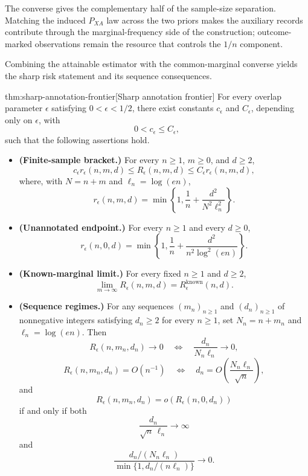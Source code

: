 \documentclass[11pt]{article}
\begin{document}
The converse gives the complementary half of the sample-size separation. Matching the induced \(P_{XA}\) law across the two priors makes the auxiliary records contribute through the marginal-frequency side of the construction; outcome-marked observations remain the resource that controls the \(1/n\) component.

Combining the attainable estimator with the common-marginal converse yields the sharp risk statement and its sequence consequences.

\begin{theoremv}{thm:sharp-annotation-frontier}[Sharp annotation frontier]
For every overlap parameter \(\epsilon\) satisfying \(0<\epsilon<1/2\), there exist constants \(c_\epsilon\) and \(C_\epsilon\), depending only on \(\epsilon\), with
\[
0<c_\epsilon\le C_\epsilon,
\]
such that the following assertions hold.

\begin{itemize}
\item \textbf{(Finite-sample bracket.)} For every \(n\ge1\), \(m\ge0\), and \(d\ge2\),
\[
c_\epsilon r_\epsilon(n,m,d)
\le R_\epsilon(n,m,d)
\le C_\epsilon r_\epsilon(n,m,d),
\]
where, with \(N=n+m\) and \(\ell_n=\log(en)\),
\[
r_\epsilon(n,m,d)
=
\min\!\left\{1,\frac1n+\frac{d^2}{N^2\ell_n^2}\right\}.
\]

\item \textbf{(Unannotated endpoint.)} For every \(n\ge1\) and every \(d\ge0\),
\[
r_\epsilon(n,0,d)
=
\min\!\left\{1,\frac1n+\frac{d^2}{n^2\log^2(en)}\right\}.
\]

\item \textbf{(Known-marginal limit.)} For every fixed \(n\ge1\) and \(d\ge2\),
\[
\lim_{m\to\infty} R_\epsilon(n,m,d)
=
R_\epsilon^{\mathrm{known}}(n,d).
\]

\item \textbf{(Sequence regimes.)} For any sequences \((m_n)_{n\ge1}\) and \((d_n)_{n\ge1}\) of nonnegative integers satisfying \(d_n\ge2\) for every \(n\ge1\), set \(N_n=n+m_n\) and \(\ell_n=\log(en)\). Then
\[
R_\epsilon(n,m_n,d_n)\to0
\quad\Longleftrightarrow\quad
\frac{d_n}{N_n\ell_n}\to0,
\]
\[
R_\epsilon(n,m_n,d_n)=O(n^{-1})
\quad\Longleftrightarrow\quad
d_n=O\!\left(\frac{N_n\ell_n}{\sqrt n}\right),
\]
and
\[
R_\epsilon(n,m_n,d_n)
=
o\!\left(R_\epsilon(n,0,d_n)\right)
\]
if and only if both
\[
\frac{d_n}{\sqrt n\,\ell_n}\to\infty
\]
and
\[
\frac{d_n/(N_n\ell_n)}
{\min\{1,d_n/(n\ell_n)\}}
\to0.
\]
\end{itemize}
\end{theoremv}
\end{document}
